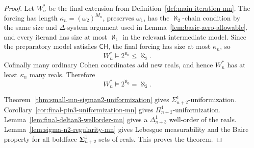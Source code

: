 \documentclass[a4paper,11pt]{article}
\newcommand{\CH}{\mathsf{CH}}
\begin{document}
\begin{proof}
Let $W_n^\ast$ be the final extension from Definition~\ref{def:main-iteration-mn}.  The forcing has length $\kappa_n=(\omega_2)^{M_n}$, preserves $\omega_1$, has the $\aleph_2$-chain condition by the same size and $\Delta$-system argument used in Lemma~\ref{lem:basic-zero-allowable}, and every iterand has size at most $\aleph_1$ in the relevant intermediate model.  Since the preparatory model satisfies $\CH$, the final forcing has size at most $\kappa_n$, so
\[
   W_n^\ast\models 2^{\aleph_0}\leq\aleph_2.
\]
Cofinally many ordinary Cohen coordinates add new reals, and hence $W_n^\ast$ has at least $\kappa_n$ many reals.  Therefore
\[
   W_n^\ast\models 2^{\aleph_0}=\aleph_2.
\]

Theorem~\ref{thm:small-mn-sigman2-uniformization} gives $\Sigma^1_{n+2}$-uniformization.  Corollary~\ref{cor:final-pin3-uniformization-mn} gives $\Pi^1_{n+3}$-uniformization.  Lemma~\ref{lem:final-deltan3-wellorder-mn} gives a $\Delta^1_{n+3}$ well-order of the reals.  Lemma~\ref{lem:sigma-n2-regularity-mn} gives Lebesgue measurability and the Baire property for all boldface $\boldsymbol\Sigma^1_{n+2}$ sets of reals.  This proves the theorem.
\end{proof}




\end{document}
